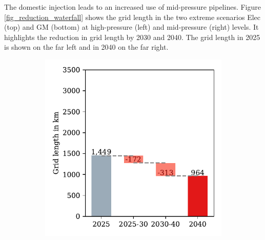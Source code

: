 The domestic injection leads to an increased use of mid-pressure pipelines. Figure \ref{fig_reduction_waterfall} shows the grid length in the two extreme scenarios Elec (top) and GM (bottom) at high-pressure (left) and mid-pressure (right) levels. It highlights the reduction in grid length by 2030 and 2040. The grid length in 2025 is shown on the far left and in 2040 on the far right. 

\begin{figure}[h]
	\begin{subfigure}[c]{0.5\textwidth}
		\centering
		\includegraphics[width=1\linewidth]{figures/results/waterfall/waterfall_elec_high.pdf}
		\vspace{-0.6cm}
		\label{Fig:a}
	\end{subfigure}
	\begin{subfigure}[c]{0.5\textwidth}
		\centering

\end{subfigure}
\end{figure}
